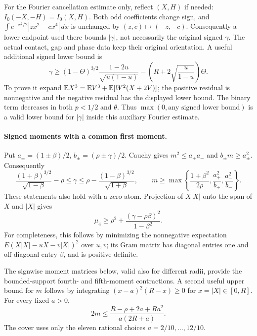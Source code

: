 For the Fourier cancellation estimate only, reflect $(X,H)$ if needed:
$I_0(-X,-H)=I_0(X,H)$. Both odd coefficients change sign, and
$\int e^{-x^2/2}|zx^2-cx^4|\,dx$ is unchanged by $(z,c)\mapsto(-z,-c)$.
Consequently a lower endpoint used there bounds $|\gamma|$, not necessarily
the original signed $\gamma$. The actual contact, gap and phase data keep
their original orientation. A useful additional signed lower bound is
\begin{equation}\label{j:local:re:gamma}
 \gamma\ge(1-\Theta)^{3/2}\frac{1-2u}{\sqrt{u(1-u)}}
       -\left(R+2\sqrt{\frac{u}{1-u}}\right)\Theta.
\end{equation}
To prove it expand $\mathbb E X^3=\mathbb E V^3+\mathbb E[W^2(X+2V)]$; the positive
residual is nonnegative and the negative residual has the displayed
lower bound. The binary term decreases in both $p<1/2$ and $\theta$.
Thus $\max(0,\text{any signed lower bound})$ is a valid lower bound for
$|\gamma|$ inside this auxiliary Fourier estimate.



\paragraph{Signed moments with a common first moment.}\label{j:local:atlas}\label{j:local:moments}
Put $a_\pm=(1\pm\beta)/2$, $b_\pm=(\rho\pm\gamma)/2$.
Cauchy gives $m^2\le a_+a_-$ and $b_\pm m\ge a_\pm^2$.
Consequently
\[
 \frac{(1+\beta)^{3/2}}{\sqrt{1-\beta}}-\rho
 \le\gamma\le
 \rho-\frac{(1-\beta)^{3/2}}{\sqrt{1+\beta}},\qquad
 m\ge\max\left\{\frac{1+\beta^2}{2\rho},
                  \frac{a_+^2}{b_+},\frac{a_-^2}{b_-}\right\}.
\]
These statements also hold with a zero atom. Projection of $X|X|$ onto
the span of $X$ and $|X|$ gives
\[
 \mu_4\ge\rho^2+\frac{(\gamma-\rho\beta)^2}{1-\beta^2}.
\]
For completeness, this follows by minimizing the nonnegative expectation
$E(X|X|-uX-v|X|)^2$ over $u,v$; its Gram matrix has diagonal entries
one and off-diagonal entry $\beta$, and is positive definite.

The signwise moment matrices below, valid also for different radii,
provide the bounded-support fourth- and fifth-moment contractions.
A second useful upper bound for $m$ follows by integrating
$(x-a)^2(R-x)\ge0$ for $x=|X|\in[0,R]$. For every fixed $a>0$,
\[
 2m\le\frac{R-\rho+2a+Ra^2}{a(2R+a)}.
\]
The cover uses only the eleven rational choices $a=2/10,\ldots,12/10$.

